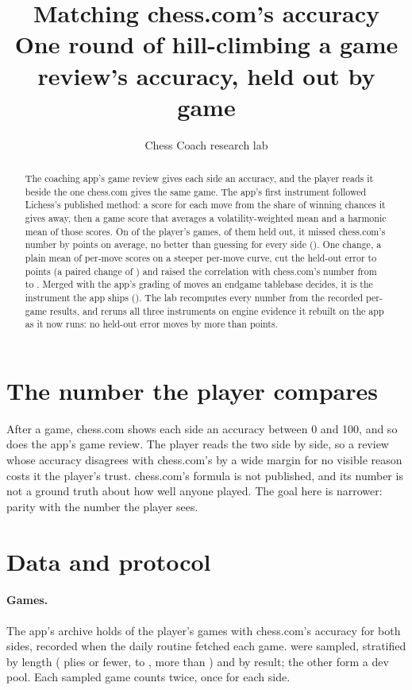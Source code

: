 \documentclass[11pt]{article}
\title{Matching chess.com's accuracy\\[0.3em]
\large One round of hill-climbing a game review's accuracy, held out by game}
\author{Chess Coach research lab}
\date{}
\begin{document}
\maketitle

\begin{abstract}
The coaching app's game review gives each side an accuracy, and the player reads it beside the
one chess.com gives the same game. The app's first instrument followed Lichess's published
method: a score for each move from the share of winning chances it gives away, then a game
score that averages a volatility-weighted mean and a harmonic mean of those scores. On
\Games{} of the player's games, \GamesTest{} of them held out, it missed chess.com's number by
\BaseTestMae{} points on average, no better than guessing \ConstantGuess{} for every side
(\ConstantTestMae). One change, a plain mean of per-move scores on a steeper per-move curve,
cut the held-out error to \OneTestMae{} points (a paired change of \OneVsBase) and raised the
correlation with chess.com's number from \BaseTestR{} to \OneTestR. Merged with the app's
grading of moves an endgame tablebase decides, it is the instrument the app ships
(\TwoTestMae). The lab recomputes every number from the recorded per-game results, and reruns
all three instruments on engine evidence it rebuilt on the app as it now runs: no held-out
error moves by more than \ReproLargest{} points.
\end{abstract}

\section{The number the player compares}

After a game, chess.com shows each side an accuracy between 0 and 100, and so does the app's
game review. The player reads the two side by side, so a review whose accuracy disagrees with
chess.com's by a wide margin for no visible reason costs it the player's trust. chess.com's
formula is not published, and its number is not a ground truth about how well anyone played.
The goal here is narrower: parity with the number the player sees.

\section{Data and protocol}

\paragraph{Games.} The app's archive holds \Eligible{} of the player's games with chess.com's
accuracy for both sides, recorded when the daily routine fetched each game. \Games{} were
sampled, stratified by length (\ShortMax{} plies or fewer, \MediumMin{} to \MediumMax, more than \MediumMax) and
by result; the
other \DevPool{} form a dev pool. Each sampled game counts twice, once for each side.
\end{document}
